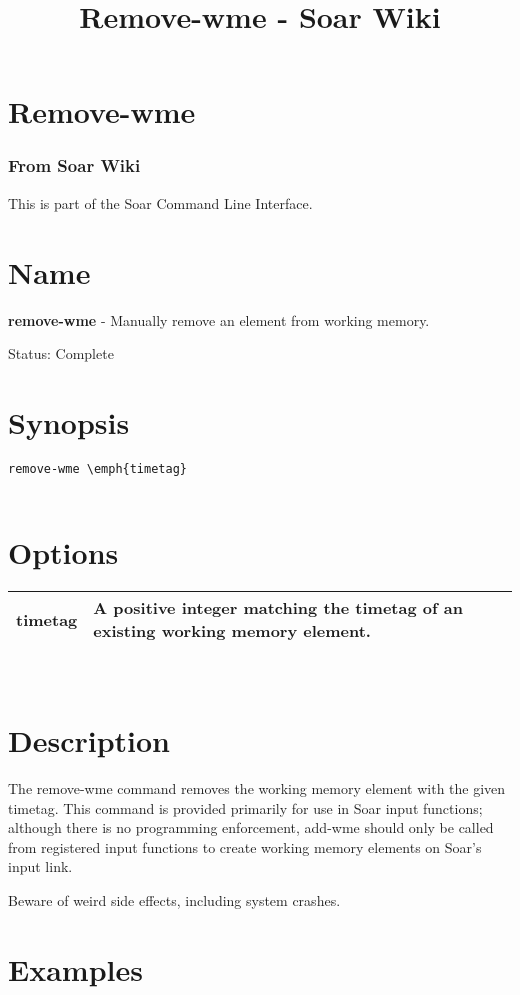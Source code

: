 \documentclass[10pt]{article}
\title{Remove-wme - Soar Wiki}
\begin{document}
\section*{Remove-wme}
\subsubsection*{From Soar Wiki}


 This is part of the Soar Command Line Interface. 
\section*{ Name }


 \textbf{remove-wme}
 - Manually remove an element from working memory. 


 Status: Complete
\section*{ Synopsis }
\begin{verbatim}
remove-wme \emph{timetag}


\end{verbatim}
\section*{ Options }


\begin{tabular}{|p{1in}|p{5in}|}
\hline 
 timetag  & A positive integer matching the timetag of an existing working memory element.  \\
 \hline 

\end{tabular}



 \\ 

\section*{ Description }


 The remove-wme command removes the working memory element with the given timetag. This command is provided primarily for use in Soar input functions; although there is no programming enforcement, add-wme should only be called from registered input functions to create working memory elements on Soar's input link. 


 Beware of weird side effects, including system crashes. 
\section*{ Examples }
\end{document}
